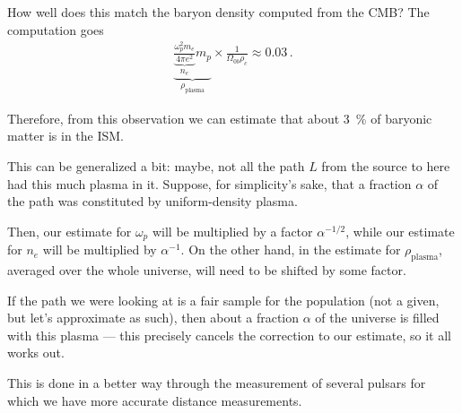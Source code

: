 \documentclass[main.tex]{subfiles}
\begin{document}
\begin{extracontent}
How well does this match the baryon density computed from the CMB? 
The computation goes  
%
\begin{align}
\underbrace{\underbrace{\frac{\omega _p^2 m_e}{4 \pi e^2}}_{n_e} m_p}_{\rho _{\text{plasma}}} \times \frac{1}{\Omega _{0b} \rho _c} \approx 0.03
\,.
\end{align}

Therefore, from this observation we can estimate that about \SI{3}{\percent} of baryonic matter is in the ISM. 

This can be generalized a bit: maybe, not all the path \(L\) from the source to here had this much plasma in it. 
Suppose, for simplicity's sake, that a fraction \(\alpha \) of the path was constituted by uniform-density plasma. 

Then, our estimate for \(\omega _p\) will be multiplied by a factor \(\alpha^{-1/2}\), while our estimate for \(n_e\) will be multiplied by \(\alpha^{-1}\). 
On the other hand, in the estimate for \(\rho _{\text{plasma}}\), averaged over the whole universe, will need to be shifted by some factor. 

If the path we were looking at is a fair sample for the population (not a given, but let's approximate as such), then about a fraction \(\alpha \) of the universe is filled with this plasma --- this precisely cancels the correction to our estimate, so it all works out. 

This is done in a better way through the measurement of several pulsars for which we have more accurate distance measurements.
\end{extracontent}

\end{document}
